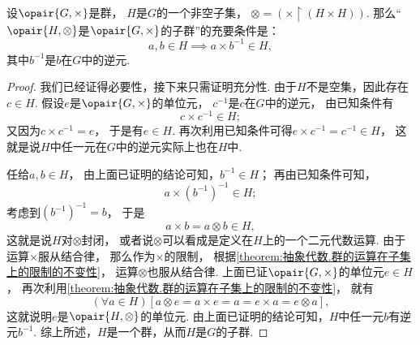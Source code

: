 \begin{theorem}
设\(\opair{G,\times}\)是群，
\(H\)是\(G\)的一个非空子集，
\(\otimes = (\times \upharpoonright(H \times H))\).
那么“\(\opair{H,\otimes}\)是\(\opair{G,\times}\)的子群”的充要条件是：\[
	a,b \in H \implies a \times b^{-1} \in H,
\]
其中\(b^{-1}\)是\(b\)在\(G\)中的逆元.
\begin{proof}
我们已经证得必要性，接下来只需证明充分性.
由于\(H\)不是空集，因此存在\(c \in H\).
假设\(e\)是\(\opair{G,\times}\)的单位元，
\(c^{-1}\)是\(c\)在\(G\)中的逆元，
由已知条件有\[
	c \times c^{-1} \in H;
\]
又因为\(c \times c^{-1} = e\)，
于是有\(e \in H\).
再次利用已知条件可得\(e \times c^{-1} = c^{-1} \in H\)，
这就是说\(H\)中任一元在\(G\)中的逆元实际上也在\(H\)中.

任给\(a,b \in H\)，
由上面已证明的结论可知，\(b^{-1} \in H\)；
再由已知条件可知，\[
	a \times (b^{-1})^{-1} \in H;
\]
考虑到\((b^{-1})^{-1} = b\)，
于是\[
	a \times b = a \otimes b \in H,
\]
这就是说\(H\)对\(\otimes\)封闭，
或者说\(\otimes\)可以看成是定义在\(H\)上的一个二元代数运算.
由于运算\(\times\)服从结合律，
那么作为\(\times\)的限制，
根据\cref{theorem:抽象代数.群的运算在子集上的限制的不变性}，
运算\(\otimes\)也服从结合律.
上面已证\(\opair{G,\times}\)的单位元\(e \in H\)，
再次利用\cref{theorem:抽象代数.群的运算在子集上的限制的不变性}，
就有\[
	(\forall a \in H)[
		a \otimes e = a \times e = a = e \times a = e \otimes a
	],
\]
这就说明\(e\)是\(\opair{H,\otimes}\)的单位元.
由上面已证明的结论可知，\(H\)中任一元\(b\)有逆元\(b^{-1}\).
综上所述，\(H\)是一个群，从而\(H\)是\(G\)的子群.
\end{proof}
\end{theorem}


%
%
%


